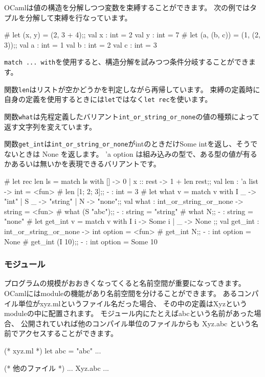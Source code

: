 \documentclass[mingoth,a4paper]{jsarticle}
\begin{document}
OCamlは値の構造を分解しつつ変数を束縛することができます。
次の例ではタプルを分解して束縛を行なっています。

\begin{commandline}
# let (x, y) = (2, 3 + 4);;
val x : int = 2
val y : int = 7
# let (a, (b, c)) = (1, (2, 3));;
val a : int = 1
val b : int = 2
val c : int = 3
\end{commandline}

\verb|match ... with|を使用すると、構造分解を試みつつ条件分岐することができます。

関数\verb|len|はリストが空かどうかを判定しながら再帰しています。
束縛の定義時に自身の定義を使用するときには\verb|let|ではなく\verb|let rec|を使います。

関数\verb|what|は先程定義したバリアント\verb|int_or_string_or_none|の値の種類によって返す文字列を変えています。

関数\verb|get_int|は\verb|int_or_string_or_none|がintのときだけSome intを返し、そうでないときは None を返します。
'a option は組み込みの型で、ある型の値が有るかあるいは無いかを表現できるバリアントです。

\begin{commandline}
# let rec len ls = match ls with [] -> 0 | x :: rest -> 1 + len rest;;
val len : 'a list -> int = <fun>
# len [1; 2; 3];;
- : int = 3
# let what v = match v with I _ -> "int" | S _ -> "string" | N -> "none";;
val what : int_or_string_or_none -> string = <fun>
# what (S "abc");;
- : string = "string"
# what N;;
- : string = "none"
# let get_int v = match v with I i -> Some i | _ -> None ;;
val get_int : int_or_string_or_none -> int option = <fun>
# get_int N;;
- : int option = None
# get_int (I 10);;
- : int option = Some 10
\end{commandline}

\subsubsection{モジュール}

プログラムの規模がおおきくなってくると名前空間が重要になってきます。
OCamlにはmoduleの機能があり名前空間を分けることができます。
あるコンパイル単位がxyz.mlというファイル名だった場合、
その中の定義はXyzというmoduleの中に配置されます。
モジュール内にたとえばabcという名前があった場合、
公開されていれば他のコンパイル単位のファイルからも Xyz.abc という名前でアクセスすることができます。

\begin{commandline}
(* xyz.ml *)
let abc = "abc"
...


(* 他のファイル *)
... Xyz.abc ...
\end{commandline}
\end{document}
